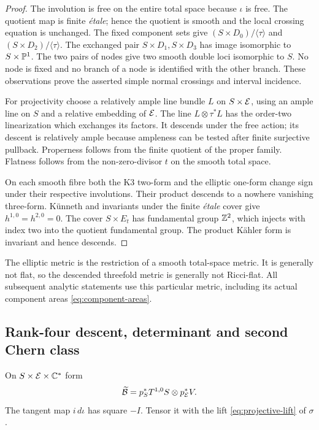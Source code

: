 \begin{proof}
The involution is free on the entire total space because $\iota$ is free.
The quotient map is finite \emph{\'{e}tale}; hence the quotient is smooth
and the local crossing equation is unchanged. The fixed component sets
give $(S\times D_0)/\langle\tau\rangle$ and
$(S\times D_2)/\langle\tau\rangle$. The exchanged pair
$S\times D_1,S\times D_3$ has image isomorphic to $S\times\mathbb P^1$.
The two pairs of nodes give two smooth double loci isomorphic to $S$.
No node is fixed and no branch of a node is identified with the other
branch. These observations prove the asserted simple normal crossings
and interval incidence.

For projectivity choose a relatively ample line bundle $L$ on
$S\times\mathcal E$, using an ample line on $S$ and a relative embedding of
$\mathcal E$. The line $L\otimes\tau^*L$ has the order-two linearization which
exchanges its factors. It descends under the free action; its descent
is relatively ample because ampleness can be tested after finite
surjective pullback. Properness follows from the finite quotient of the
proper family. Flatness follows from the non-zero-divisor $t$ on the
smooth total space.

On each smooth fibre both the K3 two-form and the elliptic one-form
change sign under their respective involutions. Their product descends
to a nowhere vanishing three-form. K\"unneth and invariants under the
finite \emph{\'{e}tale} cover give $h^{1,0}=h^{2,0}=0$.
The cover $S\times E_t$ has fundamental group $\mathbb Z^2$, which injects
with index two into the quotient fundamental group. The product K\"ahler
form is invariant and hence descends.
\end{proof}

The elliptic metric is the restriction of a smooth total-space metric.
It is generally not flat, so the descended threefold metric is generally
not Ricci-flat. All subsequent analytic statements use this particular
metric, including its actual component areas \eqref{eq:component-areas}.

\subsection{Rank-four descent, determinant and second Chern class}
On $S\times\mathcal E\times\mathbb C^*$ form
\begin{equation}\label{eq:cover-bundle}
 \widetilde{\mathcal B}=p_S^*T^{1,0}S\otimes p_{\mathcal E}^*V.
\end{equation}
The tangent map $i\,d\iota$ has square $-I$. Tensor it with the lift
\eqref{eq:projective-lift} of $\sigma$.

